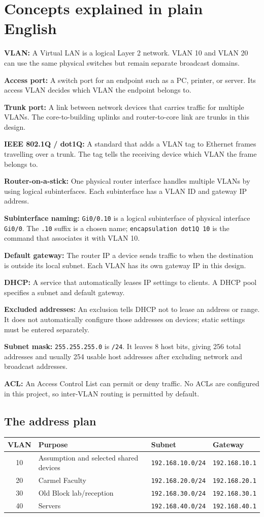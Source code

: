 \documentclass[11pt,a4paper]{article}
\newcommand{\term}[2]{\noindent\textbf{#1:} #2\par\vspace{3pt}}
\begin{document}
\section{Concepts explained in plain English}\label{sec:concepts}
\term{VLAN}{A Virtual LAN is a logical Layer 2 network. VLAN 10 and VLAN 20 can use the same physical switches but remain separate broadcast domains.}
\term{Access port}{A switch port for an endpoint such as a PC, printer, or server. Its access VLAN decides which VLAN the endpoint belongs to.}
\term{Trunk port}{A link between network devices that carries traffic for multiple VLANs. The core-to-building uplinks and router-to-core link are trunks in this design.}
\term{IEEE 802.1Q / dot1Q}{A standard that adds a VLAN tag to Ethernet frames travelling over a trunk. The tag tells the receiving device which VLAN the frame belongs to.}
\term{Router-on-a-stick}{One physical router interface handles multiple VLANs by using logical subinterfaces. Each subinterface has a VLAN ID and gateway IP address.}
\term{Subinterface naming}{\texttt{Gi0/0.10} is a logical subinterface of physical interface \texttt{Gi0/0}. The \texttt{.10} suffix is a chosen name; \texttt{encapsulation dot1Q 10} is the command that associates it with VLAN 10.}
\term{Default gateway}{The router IP a device sends traffic to when the destination is outside its local subnet. Each VLAN has its own gateway IP in this design.}
\term{DHCP}{A service that automatically leases IP settings to clients. A DHCP pool specifies a subnet and default gateway.}
\term{Excluded addresses}{An exclusion tells DHCP not to lease an address or range. It does not automatically configure those addresses on devices; static settings must be entered separately.}
\term{Subnet mask}{\texttt{255.255.255.0} is \texttt{/24}. It leaves 8 host bits, giving 256 total addresses and usually 254 usable host addresses after excluding network and broadcast addresses.}
\term{ACL}{An Access Control List can permit or deny traffic. No ACLs are configured in this project, so inter-VLAN routing is permitted by default.}

\subsection*{The address plan}
\begin{center}
\begin{tabular}{@{}clll@{}}
\toprule
VLAN & Purpose & Subnet & Gateway\\
\midrule
10 & Assumption and selected shared devices & \texttt{192.168.10.0/24} & \texttt{192.168.10.1}\\
20 & Carmel Faculty & \texttt{192.168.20.0/24} & \texttt{192.168.20.1}\\
30 & Old Block lab/reception & \texttt{192.168.30.0/24} & \texttt{192.168.30.1}\\
40 & Servers & \texttt{192.168.40.0/24} & \texttt{192.168.40.1}\\
\bottomrule
\end{tabular}
\end{center}
\end{document}
